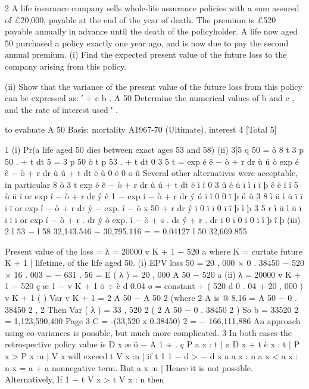 \documentclass[a4paper,12pt]{article}
\begin{document}
2
A life insurance company sells whole-life assurance policies with a sum assured of
£20,000, payable at the end of the year of death. The premium is £520 payable
annually in advance until the death of the policyholder.
A life now aged 50 purchased a policy exactly one year ago, and is now due to pay
the second annual premium.
(i) Find the expected present value of the future loss to the company arising
from this policy.

(ii) Show that the variance of the present value of the future loss from this
policy can be expressed as:
′ + c
b . A 50
Determine the numerical values of b and c , and the rate of interest used
′ .

to evaluate A 50
Basis: mortality A1967-70 (Ultimate), interest 4%
[Total 5]




1
(i) Pr(a life aged 50 dies between exact ages 53 and 58)
(ii) 3|5 q 50
= ò
8
t
3
p 50 .  + t dt
5
= 3 p 50 ò t p 53 .  + t dt
0
3
5
t
= exp é ê − ò  + r dr ù ú ò exp é ê − ò  + r dr ù ú  + t dt
ë
û
0
ë
0
o
û
Several other alternatives were acceptable, in particular
8
ò 3
t
exp é ê − ò  + r dr ù ú  + t dt
ë
ì
ï
0
3
û
é
ü
ï ì
ï
ï
þ ê
ë ï
î
5
ù
ü
ï
or exp í − ò  + r dr ý ê 1 − exp í − ò  + r dr ý ú
ï
î
0
0
ï
þ ú
û
3
8
ì
ü
ì
ü
ï
ï
ï
ï
or exp í − ò  + r dr ý − exp. í − ò \mu x 50 + r dr ý
ï 0
ï
ï 0
ï
î
þ
î
þ
3
5
r
ì
ü
ì
ü
ï
ï
ï
ï
or exp í − ò  + r . dr ý ò exp. í − ò  + s . ds ý  + r . dr
ï 0
ï 0
ï 0
ï
î
þ
î
þ
(iii)
2
l 53 − l 58 32,143.546 − 30,795.116
=
= 0.04127
l 50
32,669.855
 
Present value of the loss = λ = 20000 v K + 1 − 520 a
where K = curtate future
K + 1 |
lifetime, of the life aged 50.
(i) EPV loss
  50 = 20 , 000 × 0 . 38450 − 520 × 16 . 003 = − 631 . 56
= Ε ( λ ) = 20 , 000 A 50 − 520 a
(ii) λ = 20000 v K + 1 − 520 ç
æ 1 − v K + 1 ö
÷
è d 0.04 ø
= constant + ( 520 d 0 . 04 + 20 , 000 ) v K + 1
(
)
Var v K + 1 = 2 A 50 − A 50 2 (where 2 A is @ 8.16%
= A 50 − 0 . 38450 2 ,
2
Then Var ( λ ) = 33 , 520 2
(
2
A 50 − 0 . 38450 2
)
So b = 33520 2 = 1,123,590,400
Page 3%
C = -(33,520 x 0.38450) 2 = − 166,111,886
An approach using co-variances is possible, but much more complicated.
3
In both cases the retrospective policy value is
D x æ
ö
  − A 1 ÷ .
ç P a
x : t | ø
D x + t è x : t |
P x > P x :n |
V x will exceed t V x :n | if
t
1
1
− d >
− d
 x
a
a  x : n
a  x < a  x : n
  x = a
  + a nonnegative term.
But a
x :n |
Hence it is not possible.
Alternatively,
If
1 −
t V x
> t V x : n then
\end{document}
